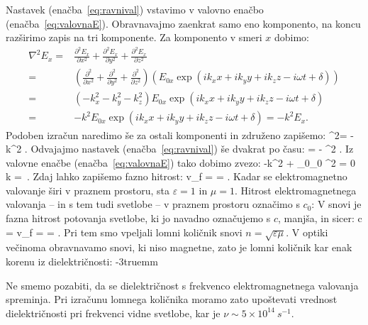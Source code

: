 Nastavek 
(enačba~\ref{eq:ravnival}) vstavimo v valovno enačbo (enačba~\ref{eq:valovnaE}). 
Obravnavajmo zaenkrat samo eno komponento, na koncu razširimo zapis na tri komponente. 
Za komponento v smeri $x$ dobimo:
\begin{align}
\nabla^2E_x =& \frac{\partial^2E_x}{\partial x^2} + \frac{\partial^2E_x}{\partial y^2} + 
\frac{\partial^2E_x}{\partial z^2} \nonumber \\
=& \left(\frac{\partial^2}{\partial x^2} + 
\frac{\partial^2}{\partial y^2} + \frac{\partial^2}{\partial z^2}\right) \left(
E_{0x} \exp\left( ik_xx+ik_yy+ik_zz -i\omega t + \delta\right) \right)\nonumber \\
=& \left( -k_x^2 -k_y^2-k_z^2\right) E_{0x} \exp\left( ik_xx+ik_yy+ik_zz -i\omega t + \delta\right)\nonumber \\
=& -k^2 E_{0x} \exp\left( ik_xx+ik_yy+ik_zz -i\omega t + \delta\right) = -k^2 E_x.
\label{eq:03_11}
\end{align}
Podoben izračun naredimo še za ostali komponenti in združeno zapišemo:
\beq
\nabla^2= -k^2 .
\label{eq:03_12}
\eeq
Odvajajmo nastavek (enačba~\ref{eq:ravnival}) še dvakrat po času:
\beq
{} = - \omega^2 .
\label{eq:03_13}
\eeq
Iz valovne enačbe (enačba~\ref{eq:valovnaE}) tako dobimo zvezo:
\beq
-k^2  + \varepsilon\varepsilon_0\mu\mu_0 \omega^2  = 0
\quad \Longrightarrow \quad
k = \,\omega.
\label{eq:03_15}
\eeq
Zdaj lahko zapišemo fazno hitrost:
\beq
v_f =  = .
\label{eq:fazna}
\eeq
Kadar se elektromagnetno valovanje širi v praznem prostoru, sta $\varepsilon = 1$ in $\mu=1$. 
Hitrost elektromagnetnega valovanja -- in s tem tudi svetlobe -- v praznem prostoru označimo s $c_0$:
V snovi je fazna hitrost potovanja svetlobe, ki jo navadno označujemo s $c$, manjša, in sicer:
\beq
c = v_f =  = .
\label{eq:03_16}
\eeq
Pri tem smo vpeljali lomni količnik snovi $n = \sqrt{\varepsilon\mu}$. 
V optiki večinoma obravnavamo snovi, ki niso magnetne, zato je lomni količnik kar
enak korenu iz dielektričnosti:
\vglue-3truemm
\begin{remark}
Ne smemo pozabiti, da se dielektričnost s frekvenco elektromagnetnega 
valovanja spreminja. Pri izračunu lomnega količnika moramo zato upoštevati vrednost
dielektričnosti pri  frekvenci vidne svetlobe, kar je $\nu \sim 5 \times 10^{14}~\si{s}^{-1}$. 
\end{remark}

